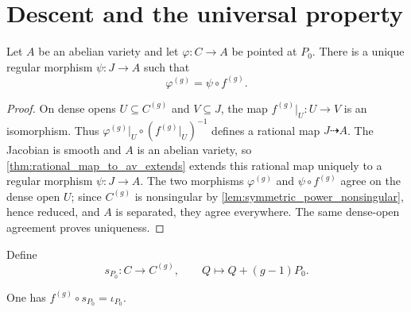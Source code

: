 \section{Descent and the universal property}
\label{sec:albaneseup_descent}

\begin{lemma}
  \label{lem:descent_through_birational_sigma}

  Let \(A\) be an abelian variety and let
  \(\varphi\colon C\to A\) be pointed at \(P_0\).  There is a unique
  regular morphism \(\psi\colon J\to A\) such that
  \[
    \varphi^{(g)}=\psi\circ f^{(g)}.
  \]
\end{lemma}

\begin{proof}
  On dense opens \(U\subseteq C^{(g)}\) and \(V\subseteq J\), the map
  \(f^{(g)}|_U\colon U\to V\) is an isomorphism.  Thus
  \(\varphi^{(g)}|_U\circ(f^{(g)}|_U)^{-1}\) defines a rational map
  \(J\dashrightarrow A\).  The Jacobian is smooth and \(A\) is an abelian
  variety, so \cref{thm:rational_map_to_av_extends} extends this rational
  map uniquely to a regular morphism \(\psi\colon J\to A\).  The two
  morphisms \(\varphi^{(g)}\) and \(\psi\circ f^{(g)}\) agree on the dense
  open \(U\); since \(C^{(g)}\) is nonsingular by
  \cref{lem:symmetric_power_nonsingular}, hence reduced, and \(A\) is
  separated, they agree everywhere.  The same dense-open agreement proves
  uniqueness.
\end{proof}

\begin{definition}
  \label{def:basepoint_section_symmetric_power}

  Define
  \[
    s_{P_0}\colon C\longrightarrow C^{(g)},\qquad
    Q\longmapsto Q+(g-1)P_0.
  \]
\end{definition}

\begin{lemma}
  \label{lem:basepoint_section_to_jacobian}

  One has \(f^{(g)}\circ s_{P_0}=\iota_{P_0}\).
\end{lemma}


